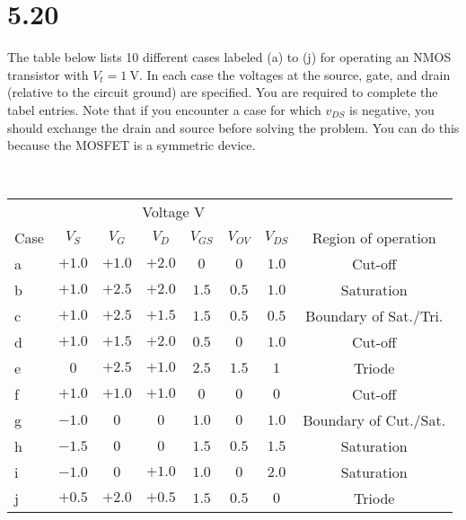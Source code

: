 \documentclass[12pt, a4paper]{article}
\begin{document}
\section{5.20}
The table below lists 10 different cases labeled (a) to (j) for operating an NMOS transistor with $V_t = \SI{1}{\V} $. In each case the voltages at the source, gate, and drain (relative to the circuit ground) are specified. You are required to complete the tabel entries. Note that if you encounter a case for which $v_{DS}$ is negative, you should exchange the drain and source before solving the problem. You can do this because the MOSFET is a symmetric device.


\Ans \\
\begin{center}
  \begin{tabular}{|l|c|c|c|c|c|c|c|}
    \hline
    & \multicolumn{6}{c|}{Voltage \si\V} & \\ \cline{2-7}
    Case & $V_S$ & $V_G$ & $V_D$ & $V_{GS}$ & $V_{OV}$ & $V_{DS}$ & Region of operation \\
    \hline
    a & $+1.0$ & $+1.0$ & $+2.0$ & $0$ & $0$ & $1.0$ & Cut-off \\
    b & $+1.0$ & $+2.5$ & $+2.0$ & $1.5$ & $0.5$ & $1.0$ & Saturation \\
    c & $+1.0$ & $+2.5$ & $+1.5$ & $1.5$ & $0.5$ & $0.5$ & Boundary of Sat./Tri. \\
    d & $+1.0$ & $+1.5$ & $+2.0$ & $0.5$ & $0$ & $1.0$ & Cut-off \\
    e & $0$ & $+2.5$ & $+1.0$ & $2.5$ & $1.5$ & $1$ & Triode \\
    f & $+1.0$ & $+1.0$ & $+1.0$ & $0$ & $0$ & $0$ & Cut-off \\
    g & $-1.0$ & $0$ & $0$ & $1.0$ & $0$ & $1.0$ & Boundary of Cut./Sat. \\
    h & $-1.5$ & $0$ & $0$ & $1.5$ & $0.5$ & $1.5$ & Saturation \\
    i & $-1.0$ & $0$ & $+1.0$ & $1.0$ & $0$ & $2.0$ & Saturation \\
    j & $+0.5$ & $+2.0$ & $+0.5$ & $1.5$ & $0.5$ & $0$ & Triode \\
    \hline
  \end{tabular}
\end{center}

\clearpage
\end{document}

